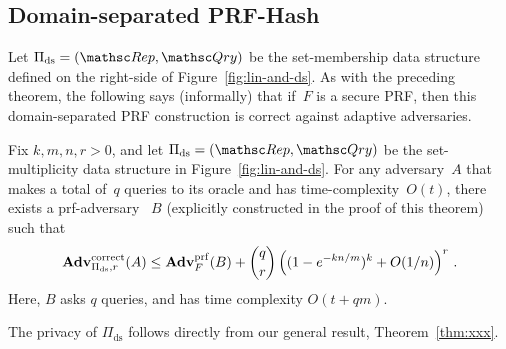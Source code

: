 


\subsection{Domain-separated PRF-Hash}
Let $\Pi_{\mathrm{ds}}= (\Rep, \Qry)$ be the set-membership data
structure defined on the right-side of Figure~\ref{fig:lin-and-ds}.
As with the preceding theorem, the following says (informally) that
if~$F$ is a secure PRF, then this domain-separated PRF construction is
correct against adaptive adversaries.  

\begin{theorem}\label{thm2}\label{thm:ds-correctness}
Fix $k,m,n,r>0$, and let $\Pi_{\mathrm{ds}}= (\Rep, \Qry)$ be the set-multiplicity data structure in Figure~\ref{fig:lin-and-ds}.  For any adversary~$A$ that makes a total of~$q$ queries to its oracle and has time-complexity~$O(t)$, there exists a prf-adversary ~$B$ (explicitly constructed in the proof of this theorem) such that
\[
\mathrm{\mathbf{Adv}}^{\mathrm{correct}}_{\Pi_{\mathrm{ds}},r}(A) \leq  \mathbf{Adv}^{\mathrm{prf}}_{F}(B)  + {\dbinom{q}{r}} \left( (1-e^{-kn/m})^k + O(1/n) \right)^r\,.
\]
Here, $B$ asks $q$ queries, and has time complexity $O(t+qm)$.
\end{theorem}

The privacy of $\Pi_{\mathrm{ds}}$ follows directly from our general result, Theorem~\ref{thm:xxx}.


